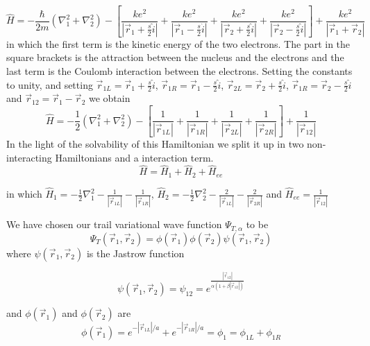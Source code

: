 \documentclass{article}
\begin{document}
\begin{equation}
 \hat{H}=-\frac{\hbar}{2m}\left( \nabla_1^2 + \nabla_2^2 \right) - \left[ \frac{ke^2}{\left| \vec{r}_1 + \frac{s}{2} \hat{i} \right|} + \frac{ke^2}{\left| \vec{r}_1 - \frac{s}{2} \hat{i} \right|}  +\frac{ke^2}{\left| \vec{r}_2 + \frac{s}{2} \hat{i} \right|}  +\frac{ke^2}{\left| \vec{r}_2 - \frac{s}{2} \hat{i} \right|} \right] +\frac{ke^2}{\left| \vec{r}_1 + \vec{r}_2 \right|} 
\end{equation}
in which the first term is the kinetic energy of the two electrons. The part in the square brackets is the attraction between the nucleus and the electrons and the last term is the Coulomb interaction between the electrons. Setting the constants to unity, and setting $\vec{r}_{1L} = \vec{r}_1 + \frac{s}{2} \hat{i}$, $\vec{r}_{1R} = \vec{r}_1 - \frac{s}{2} \hat{i}$, $\vec{r}_{2L} = \vec{r}_2 + \frac{s}{2} \hat{i}$, $\vec{r}_{1R} = \vec{r}_2 - \frac{s}{2} \hat{i}$ and $\vec{r}_{12} = \vec{r}_1 -\vec{r}_2$ we obtain
\begin{equation}
\hat{H}=-\frac{1}{2}\left( \nabla_1^2 + \nabla_2^2 \right) - \left[ \frac{1}{|\vec{r}_{1L}|} +\frac{1}{|\vec{r}_{1R}|}+\frac{1}{|\vec{r}_{2L}|}+\frac{1}{|\vec{r}_{2R}|} \right] +\frac{1}{\left| \vec{r}_{12} \right|} 
\end{equation}
In the light of the solvability of this Hamiltonian we split it up in two non-interacting Hamiltonians and a interaction term.
\begin{equation}
 \hat{H}=\hat{H}_1 + \hat{H}_2 + \hat{H}_{ee}
\end{equation}

in which $\hat{H}_1=-\frac{1}{2}\nabla_1^2 - \frac{1}{|\vec{r}_{1L}|} -\frac{1}{|\vec{r}_{1R}|}$, $\hat{H}_2=-\frac{1}{2}\nabla_2^2 - \frac{2}{|\vec{r}_{1L}|} -\frac{2}{|\vec{r}_{2R}|}$ and $\hat{H}_{ee}=\frac{1}{|\vec{r}_{12}|}$

We have chosen our trail variational wave function $\Psi_{T,\alpha}$ to be
\begin{equation}
 \Psi_{T}(\vec{r}_1,\vec{r}_2)=\phi(\vec{r}_1)\phi(\vec{r}_2)\psi(\vec{r}_1,\vec{r}_2)
\end{equation}
where $\psi(\vec{r}_1,\vec{r}_2)$ is the Jastrow function

\begin{equation}
\psi(\vec{r}_1,\vec{r}_2) = \psi_{12} = e^{\frac{\left| \vec{r}_{12}  \right|}{\alpha(1+\beta |\vec{r}_{12}|)} }
\end{equation}

and $\phi(\vec{r}_1)$ and $\phi(\vec{r}_2)$ are
\begin{equation}
 \phi(\vec{r}_1) = e^{-|\vec{r}_{1L}|/a} + e^{-|\vec{r}_{1R}|/a} =\phi_1= \phi_{1L} +\phi_{1R}
\end{equation}
\end{document}
